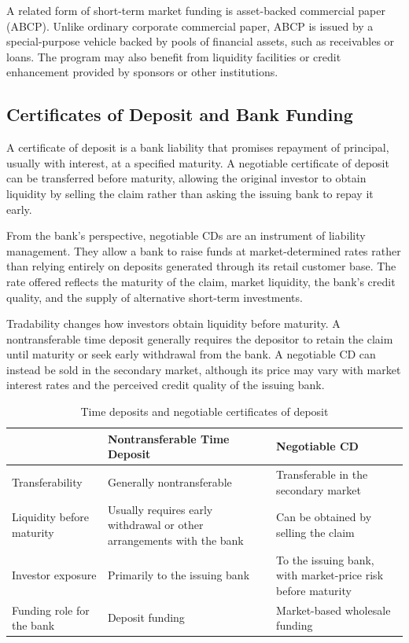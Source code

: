 A related form of short-term market funding is
asset-backed commercial paper (ABCP). Unlike ordinary
corporate commercial paper, ABCP is issued by a
special-purpose vehicle backed by pools of financial
assets, such as receivables or loans. The program may
also benefit from liquidity facilities or credit
enhancement provided by sponsors or other institutions.

\subsection{Certificates of Deposit and Bank Funding}

A certificate of deposit is a bank liability that promises repayment of principal, usually with interest, at a specified maturity. A negotiable certificate of deposit can be transferred before maturity, allowing the original investor to obtain liquidity by selling the claim rather than asking the issuing bank to repay it early.

From the bank's perspective, negotiable CDs are an instrument of liability management. They allow a bank to raise funds at market-determined rates rather than relying entirely on deposits generated through its retail customer base. The rate offered reflects the maturity of the claim, market liquidity, the bank's credit quality, and the supply of alternative short-term investments.

Tradability changes how investors obtain liquidity before maturity. A nontransferable time deposit generally requires the depositor to retain the claim until maturity or seek early withdrawal from the bank. A negotiable CD can instead be sold in the secondary market, although its price may vary with market interest rates and the perceived credit quality of the issuing bank.

\begin{table}[H]
\centering
\caption{Time deposits and negotiable certificates of deposit}
\label{tab:ch7-cd-comparison}

\begin{tabularx}{\textwidth}{lXX}
\toprule
 & \textbf{Nontransferable Time Deposit} & \textbf{Negotiable CD} \\
\midrule

Transferability
& Generally nontransferable
& Transferable in the secondary market \\

Liquidity before maturity
& Usually requires early withdrawal or other arrangements with the bank
& Can be obtained by selling the claim \\

Investor exposure
& Primarily to the issuing bank
& To the issuing bank, with market-price risk before maturity \\

Funding role for the bank
& Deposit funding
& Market-based wholesale funding \\

\bottomrule
\end{tabularx}
\end{table}

